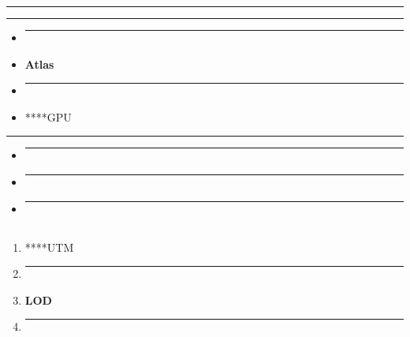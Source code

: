 \begin{center}\rule{0.5\linewidth}{0.5pt}\end{center}

\begin{center}\rule{0.5\linewidth}{0.5pt}\end{center}

\begin{itemize}
\item
  \begin{center}\rule{0.5\linewidth}{0.5pt}\end{center}
\item
  \textbf{Atlas}
\item
  \begin{center}\rule{0.5\linewidth}{0.5pt}\end{center}
\item
  ****GPU
\end{itemize}

\begin{center}\rule{0.5\linewidth}{0.5pt}\end{center}

\begin{itemize}
\item
  \begin{center}\rule{0.5\linewidth}{0.5pt}\end{center}
\item
  \begin{center}\rule{0.5\linewidth}{0.5pt}\end{center}
\item
  \begin{center}\rule{0.5\linewidth}{0.5pt}\end{center}
\end{itemize}

\subsection{}\label{section-39}

\begin{enumerate}
\def\labelenumi{\arabic{enumi}.}
\item
  ****UTM
\item
  \begin{center}\rule{0.5\linewidth}{0.5pt}\end{center}
\item
  \textbf{LOD}
\item
  \begin{center}\rule{0.5\linewidth}{0.5pt}\end{center}
\end{enumerate}

